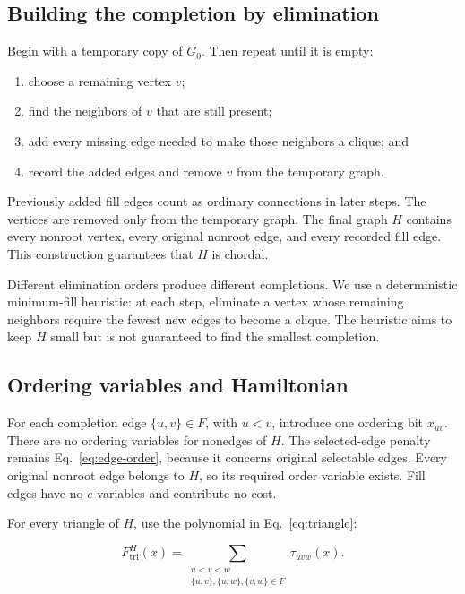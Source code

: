 \documentclass[10pt,a4paper]{article}
\begin{document}
\subsection{Building the completion by elimination}

Begin with a temporary copy of $G_0$. Then repeat until it is empty:

\begin{enumerate}
  \item choose a remaining vertex $v$;
  \item find the neighbors of $v$ that are still present;
  \item add every missing edge needed to make those neighbors a clique; and
  \item record the added edges and remove $v$ from the temporary graph.
\end{enumerate}

Previously added fill edges count as ordinary connections in later steps. The
vertices are removed only from the temporary graph. The final graph $H$
contains every nonroot vertex, every original nonroot edge, and every recorded
fill edge. This construction guarantees that $H$ is chordal.

Different elimination orders produce different completions. We use a
deterministic minimum-fill heuristic: at each step, eliminate a vertex whose
remaining neighbors require the fewest new edges to become a clique. The
heuristic aims to keep $H$ small but is not guaranteed to find the smallest
completion.

\subsection{Ordering variables and Hamiltonian}

For each completion edge $\{u,v\}\in F$, with $u<v$, introduce one ordering
bit $x_{uv}$. There are no ordering variables for nonedges of $H$. The
selected-edge penalty remains Eq.~\eqref{eq:edge-order}, because it concerns
original selectable edges. Every original nonroot edge belongs to $H$, so its
required order variable exists. Fill edges have no $e$-variables and contribute
no cost.

For every triangle of $H$, use the polynomial in Eq.~\eqref{eq:triangle}:

\begin{equation}
F_{\mathrm{tri}}^{H}(x)=
\sum_{\substack{u<v<w\\
\{u,v\},\{u,w\},\{v,w\}\in F}}
\tau_{uvw}(x).
\label{eq:chordal-triangle}
\end{equation}
\end{document}
